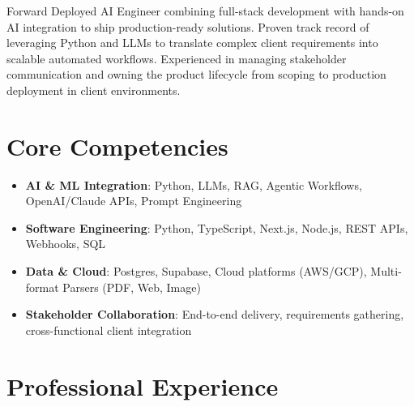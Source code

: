 \documentclass[11pt,a4paper,sans]{moderncv}
\begin{document}
\makecvtitle

Forward Deployed AI Engineer combining full-stack development with hands-on AI integration to ship production-ready solutions. Proven track record of leveraging Python and LLMs to translate complex client requirements into scalable automated workflows. Experienced in managing stakeholder communication and owning the product lifecycle from scoping to production deployment in client environments.

\vspace{3pt}
\section{Core Competencies}
\begin{itemize}
\item \textbf{AI \& ML Integration}: Python, LLMs, RAG, Agentic Workflows, OpenAI/Claude APIs, Prompt Engineering
\item \textbf{Software Engineering}: Python, TypeScript, Next.js, Node.js, REST APIs, Webhooks, SQL
\item \textbf{Data \& Cloud}: Postgres, Supabase, Cloud platforms (AWS/GCP), Multi-format Parsers (PDF, Web, Image)
\item \textbf{Stakeholder Collaboration}: End-to-end delivery, requirements gathering, cross-functional client integration
\end{itemize}

\section{Professional Experience}
\end{document}
